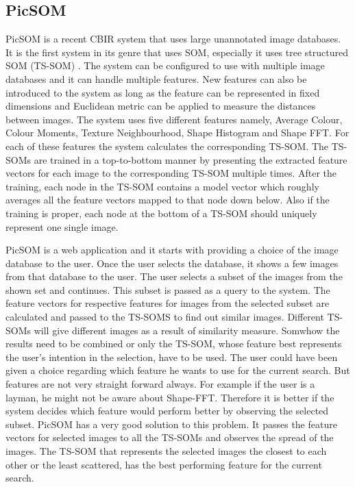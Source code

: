 \documentclass[english]{tktltiki}
\begin{document}
\subsection{PicSOM}

PicSOM is a recent CBIR system that uses large unannotated image databases. It is the first system in its genre that uses SOM, especially it uses tree structured SOM (TS-SOM) \cite{TSSOM} \cite{TSSOM_progress}. The system can be configured to use with multiple image databases and it can handle multiple features. New features can also be introduced to the system as long as the feature can be represented in fixed dimensions and Euclidean metric can be applied to measure the distances between images. The system uses five different features namely, Average Colour, Colour Moments, Texture Neighbourhood, Shape Histogram and Shape FFT. For each of these features the system calculates the corresponding TS-SOM. The TS-SOMs are trained in a top-to-bottom manner by presenting the extracted feature vectors for each image to the corresponding TS-SOM multiple times. After the training, each node in the TS-SOM contains a model vector which roughly averages all the feature vectors mapped to that node down below. Also if the training is proper, each node at the bottom of a TS-SOM should uniquely represent one single image.

PicSOM is a web application and it starts with providing a choice of the image database to the user. Once the user selects the database, it shows a few images from that database to the user. The user selects a subset of the images from the shown set and continues. This subset is passed as a query to the system. The feature vectors for respective features for images from the selected subset are calculated and passed to the TS-SOMS to find out similar images. Different TS-SOMs will give different images as a result of similarity measure. Somwhow the results need to be combined or only the TS-SOM, whose feature best represents the user's intention in the selection, have to be used. The user could have been given a choice regarding which feature he wants to use for the current search. But features are not very straight forward always. For example if the user is a layman, he might not be aware about Shape-FFT. Therefore it is better if the system decides which feature would perform better by observing the selected subset. PicSOM has a very good solution to this problem. It passes the feature vectors for selected images to all the TS-SOMs and observes the spread of the images. The TS-SOM that represents the selected images the closest to each other or the least scattered, has the best performing feature for the current search.
\end{document}
